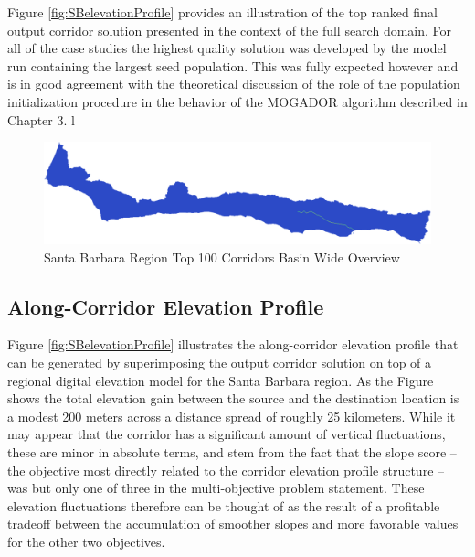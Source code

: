 Figure \ref{fig:SBelevationProfile} provides an illustration of the top ranked final output corridor solution presented in the context of the full search domain. For all of the case studies the highest quality solution was developed by the model run containing the largest seed population. This was fully expected however and is in good agreement with the theoretical discussion of the role of the population initialization procedure in the behavior of the MOGADOR algorithm described in Chapter 3. l

        \begin{figure}[!h]
            \begin{center}
            \includegraphics[width=5.5in]{figures/SantaBarbara_PathwayLarge.png}   
            \caption{Santa Barbara Region Top 100 Corridors Basin Wide Overview}
            \label{fig:SBsolutionOverview}
            \end{center}
        \end{figure}
        
    \subsection{Along-Corridor Elevation Profile}
    
Figure \ref{fig:SBelevationProfile} illustrates the along-corridor elevation profile that can be generated by superimposing the output corridor solution on top of a regional digital elevation model for the Santa Barbara region. As the Figure shows the total elevation gain between the source and the destination location is a modest 200 meters across a distance spread of roughly 25 kilometers. While it may appear that the corridor has a significant amount of vertical fluctuations, these are minor in absolute terms, and stem from the fact that the slope score -- the objective most directly related to the corridor elevation profile structure -- was but only one of three in the multi-objective problem statement. These elevation fluctuations therefore can be thought of as the result of a profitable tradeoff between the accumulation of smoother slopes and more favorable values for the other two objectives. 
        
